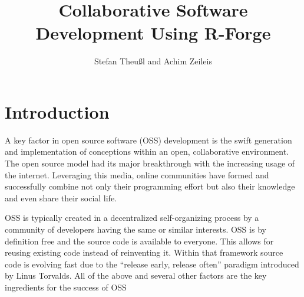 \title{Collaborative Software Development Using R-Forge}
\author{Stefan Theu\ss{}l and Achim Zeileis}

\maketitle



\newcommand{\tab}[1]{{\normalfont\textit{#1}}}

\section*{Introduction}


A key factor in open source software (OSS) development is the swift
generation and implementation of conceptions within an open,
collaborative environment. The open source model had its major
breakthrough with the increasing usage of the internet. Leveraging
this media, online communities have formed and successfully combine
not only their programming effort but also their knowledge and even
share their social life. 

OSS is typically created in a decentralized self-organizing process by a
community of developers having the same or similar interests.
OSS is by definition free and the source code is available to
everyone. This allows for reusing existing code instead of reinventing
it. Within that framework source code is evolving fast due to the ``release
early, release often'' paradigm introduced by Linus Torvalds. All of
the above and several other factors are the key ingredients for the
success of OSS \citep[see][]{forge:Raymond:1999}

